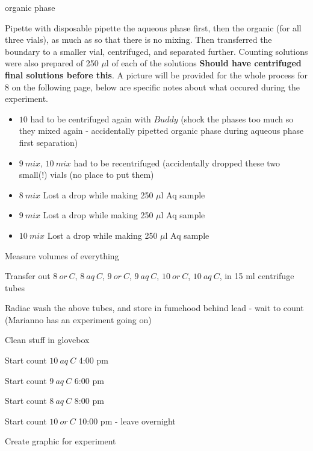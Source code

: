 \documentclass[idxtotoc,hyperref,openany,oneside]{labbook} %
\newcommand{\cmark}{\ding{51}}%
\newcommand{\done}{\rlap{$\square$}{\raisebox{2pt}{\large\hspace{1pt}\cmark}}%
  \hspace{-2.5pt}}
\begin{document}
\begin{todolist}
\begin{itemize}
{    organic phase}
  \end{itemize}
\item[\done]{Pipette with disposable pipette the aqueous phase
  first, then the organic (for all three vials),
  as much as so that there is no mixing.
  Then transferred the boundary to a smaller vial, centrifuged,
  and separated further. Counting solutions were
  also prepared of 250 $\mu$l of each of the solutions
  \textbf{Should have centrifuged final solutions before this}.
  A picture will be provided for the whole process for $\boxed{8}$
  on the following page, below are specific notes about what
  occured during the experiment.}
  \begin{itemize}
  \item{$\boxed{10}$ had to be centrifuged again with $\boxed{Buddy}$
    (shock the phases too much so they mixed again - accidentally pipetted
    organic phase during aqueous phase first separation)}
  \item{$\boxed{9\ mix}$, $\boxed{10\ mix}$ had to be recentrifuged
    (accidentally dropped these two small(!) vials (no place to put them)}
  \item{$\boxed{8\ mix}$ Lost a drop while making 250 $\mu$l Aq sample}
  \item{ $\boxed{9\ mix}$ Lost a drop while making 250 $\mu$l Aq sample}
  \item{$\boxed{10\ mix}$ Lost a drop while making 250 $\mu$l Aq sample}
  \end{itemize}
\item{Measure volumes of everything}
\item[\done]{Transfer out $\boxed{8\ or\ C}$, $\boxed{8\ aq\ C}$,
  $\boxed{9\ or\ C}$, $\boxed{9\ aq\ C}$, $\boxed{10\ or\ C}$,
  $\boxed{10\ aq\ C}$, in 15 ml centrifuge tubes}
\item[\done]{Radiac wash the above tubes, and store in fumehood behind
  lead - wait to count (Marianno has an experiment going on)}
\item[\done]{Clean stuff in glovebox}
\item[\done]{Start count $\boxed{10\ aq\ C}$ 4:00 pm}
\item[\done]{Start count $\boxed{9\ aq\ C}$ 6:00 pm}
\item[\done]{Start count $\boxed{8\ aq\ C}$ 8:00 pm}
\item[\done]{Start count $\boxed{10\ or\ C}$ 10:00 pm - leave overnight}
\item[\done]{Create graphic for experiment}
\end{todolist}
\end{document}
